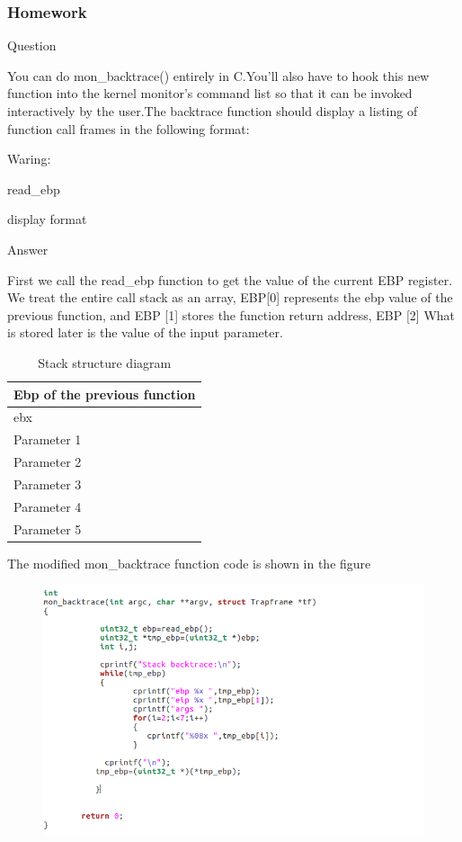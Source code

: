 \subsubsection{Homework }
\begin{flushleft}
{\Large Question}
\end{flushleft}

You can do mon\_backtrace() entirely in C.You'll also have to hook this new function into the kernel monitor's command list so that it can be invoked interactively by the user.The backtrace function should display a listing of function call frames in the following format:

Waring:

read\_ebp

display format

\begin{flushleft}
{\Large Answer}
\end{flushleft}



First we call the read\_ebp function to get the value of the current EBP register. We treat the entire call stack as an array, EBP[0] represents the ebp value of the previous function, and EBP [1] stores the function return address, EBP [2] What is stored later is the value of the input parameter.

\begin{table}[H]
\centering
\begin{tabular}{ |p{150pt}| }
\hline			
Ebp of the previous function  \\ \hline		
ebx \\ \hline 		
Parameter 1 \\ \hline 	
Parameter 2 \\ \hline
Parameter 3 \\ \hline
Parameter 4 \\ \hline
Parameter 5 \\ \hline
\end{tabular}
\caption{Stack structure diagram}
\end{table}

The modified mon\_backtrace function code is shown in the figure
\begin{figure}[H]
  \centering
  \includegraphics[width=0.8\linewidth]{figure/mon_backtrace_code}
\end{figure}

